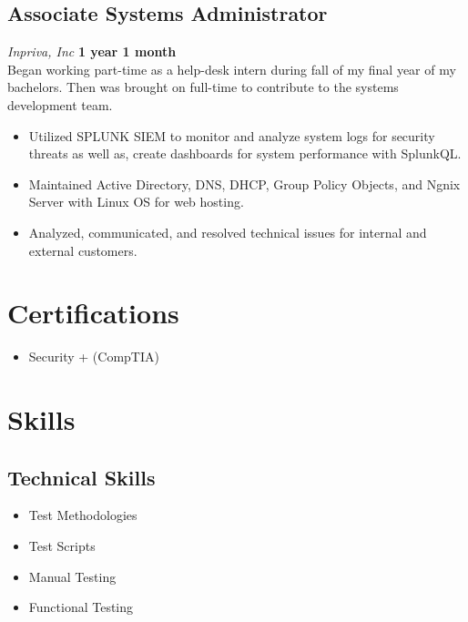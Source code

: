 \documentclass[letterpaper,10pt]{article}
\begin{document}
\begin{paracol}{2}
\begin{leftcolumn}
\subsection*{Associate Systems Administrator}
\textit{Inpriva, Inc} \hfill \textbf{1 year 1 month}\\ \vspace{2mm}
\sloppy
Began working part-time as a help-desk intern during fall of my final year of my bachelors. 
Then was brought on full-time to contribute to the systems development team. \\
\begin{itemize}[leftmargin=0.10in]
    \item Utilized SPLUNK SIEM to monitor and analyze system logs for security threats as well as, create dashboards for system performance with SplunkQL.
    \item Maintained Active Directory, DNS, DHCP, Group Policy Objects, and Ngnix Server with Linux OS for web hosting.
    \item Analyzed, communicated, and resolved technical issues for internal and external customers.
\end{itemize}


\end{leftcolumn}
\begin{rightcolumn}

\section*{Certifications}
\begin{itemize}[leftmargin=0.15in]
    \item Security + (CompTIA)
\end{itemize}
\section*{Skills}
\begin{multicols}{2}
    \subsection*{Technical Skills}
\begin{itemize}
    \item Test Methodologies
    \item Test Scripts 
    \item Manual Testing
    \item Functional Testing
\end{itemize}


\end{multicols}
\end{rightcolumn}
\end{paracol}
\end{document}
